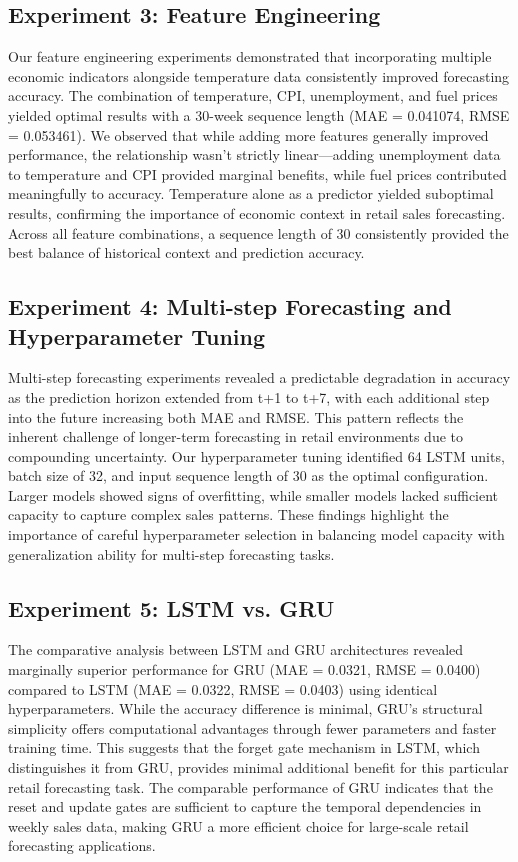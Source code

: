 \documentclass[conference]{IEEEtran}
\begin{document}
\subsection{Experiment 3: Feature Engineering}
Our feature engineering experiments demonstrated that incorporating multiple economic indicators alongside temperature data consistently improved forecasting accuracy. The combination of temperature, CPI, unemployment, and fuel prices yielded optimal results with a 30-week sequence length (MAE = 0.041074, RMSE = 0.053461). We observed that while adding more features generally improved performance, the relationship wasn't strictly linear—adding unemployment data to temperature and CPI provided marginal benefits, while fuel prices contributed meaningfully to accuracy. Temperature alone as a predictor yielded suboptimal results, confirming the importance of economic context in retail sales forecasting. Across all feature combinations, a sequence length of 30 consistently provided the best balance of historical context and prediction accuracy.

\subsection{Experiment 4: Multi-step Forecasting and Hyperparameter Tuning}
Multi-step forecasting experiments revealed a predictable degradation in accuracy as the prediction horizon extended from t+1 to t+7, with each additional step into the future increasing both MAE and RMSE. This pattern reflects the inherent challenge of longer-term forecasting in retail environments due to compounding uncertainty. Our hyperparameter tuning identified 64 LSTM units, batch size of 32, and input sequence length of 30 as the optimal configuration. Larger models showed signs of overfitting, while smaller models lacked sufficient capacity to capture complex sales patterns. These findings highlight the importance of careful hyperparameter selection in balancing model capacity with generalization ability for multi-step forecasting tasks.

\subsection{Experiment 5: LSTM vs. GRU}
The comparative analysis between LSTM and GRU architectures revealed marginally superior performance for GRU (MAE = 0.0321, RMSE = 0.0400) compared to LSTM (MAE = 0.0322, RMSE = 0.0403) using identical hyperparameters. While the accuracy difference is minimal, GRU's structural simplicity offers computational advantages through fewer parameters and faster training time. This suggests that the forget gate mechanism in LSTM, which distinguishes it from GRU, provides minimal additional benefit for this particular retail forecasting task. The comparable performance of GRU indicates that the reset and update gates are sufficient to capture the temporal dependencies in weekly sales data, making GRU a more efficient choice for large-scale retail forecasting applications.
\end{document}
